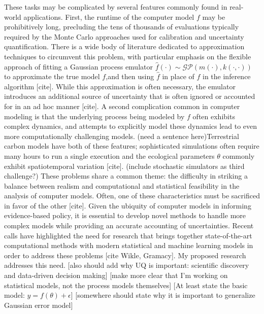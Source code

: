 \documentclass[12pt]{article}
\begin{document}
These tasks may be complicated by several features commonly found in real-world applications. First, the runtime of the computer model $f$ may be prohibitively long, 
precluding the tens of thousands of evaluations typically required by the Monte Carlo approaches used for calibration and uncertainty quantification. There is a wide body 
of literature dedicated to approximation techniques to circumvent this problem, with particular emphasis on the flexible approach of fitting a Gaussian process 
emulator $\hat{f}(\cdot) \sim \mathcal{GP}(m(\cdot), k(\cdot, \cdot))$ to approximate the true model $f$,and then using $\hat{f}$
in place of $f$ in the inference algorithm [cite]. While this approximation is often necessary, the emulator introduces an additional source of uncertainty that is often ignored 
or accounted for in an ad hoc manner [cite]. A second complication common in computer modeling is that the 
underlying process being modeled by $f$ often exhibits complex dynamics, and attempts to explicitly model these dynamics lead to even more computationally challenging
models. (need a sentence here)Terrestrial carbon models have both of these features; sophisticated simulations often require many hours to run a single execution \cite{Fer} and the ecological 
parameters $\theta$ commonly exhibit spatiotemporal variation [cite]. (include stochastic simulators as third challenge?) These problems share a common theme: the difficulty in striking 
a balance between realism and computational and statistical feasibility in the analysis of computer models. Often, one of these characteristics must be sacrificed in favor of the other [cite].
Given the ubiquity of computer models in informing evidence-based policy, it is essential to develop novel methods to handle more complex models while providing
an accurate accounting of uncertainties. 
Recent calls have highlighted the need for research that brings together state-of-the-art computational methods with modern statistical and machine learning models in order to address these problems [cite Wikle, Gramacy]. My proposed research addresses this need. 
[also should add why UQ is important: scientific discovery and data-driven decision making] [make more clear that I'm working on statistical models, not the process models themselves] [At least state the basic model: $y = f(\theta) + \epsilon$] [somewhere should state why it is important to generalize Gaussian error model]
\end{document}
